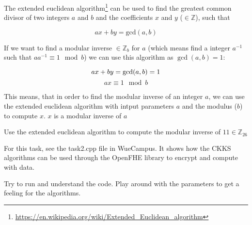 \begin{aufgabe}
The extended euclidean algorithm\footnote{\url{https://en.wikipedia.org/wiki/Extended_Euclidean_algorithm}} can be used to find the greatest common divisor of two integers $a$ and $b$ and the coefficients $x$ and $y$ ($\in \mathbb{Z}$), such that

\[
ax + by = \text{gcd}(a,b)
\]

If we want to find a modular inverse $\in \mathbb{Z}_b$ for $a$ (which means find a integer $a^{-1}$ such that $aa^{-1} \equiv 1 \mod{b}$) we can use this algorithm as $\gcd(a,b) = 1$:

\[
ax + by = \text{gcd}(a,b) = 1 \\
\]
\[
ax \equiv 1 \mod{b}
\]

This means, that in order to find the modular inverse of an integer $a$, we can use the extended euclidean algorithm with intput parameters $a$ and the modulus ($b$) to compute $x$.
$x$ is a modular inverse of $a$

Use the extended euclidean algorithm to compute the modular inverse of $11 \in \mathbb{Z}_{26}$

\end{aufgabe}



\begin{aufgabe}
For this task, see the task2.cpp file in WueCampus.
It shows how the CKKS algorithms can be used through the OpenFHE library to encrypt and compute with data.

Try to run and understand the code. Play around with the parameters to get a feeling for the algorithms.

\end{aufgabe}
